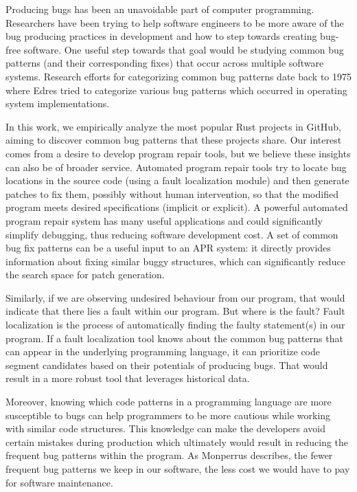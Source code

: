 Producing bugs has been an unavoidable part of computer programming. Researchers have been trying to help software engineers to be more aware of the bug producing practices in development and how to step towards creating bug-free software. One useful step towards that goal would be studying common bug patterns (and their corresponding fixes) that occur across multiple software systems. Research efforts for categorizing common bug patterns date back to 1975 where Edres tried to categorize various bug patterns which occurred in operating system implementations.  

In this work, we empirically analyze the most popular Rust projects in GitHub, aiming to discover common bug patterns that these projects share. Our interest comes from a desire to develop program repair tools, but we believe these insights can also be of broader service. Automated program repair tools try to locate bug locations in the source code (using a fault localization module) and then generate patches to fix them, possibly without human intervention, so that the modified program meets desired specifications (implicit or explicit). A powerful automated program repair system has many useful applications and could significantly simplify debugging, thus reducing software development cost. A set of common bug fix patterns can be a useful input to an APR system: it directly provides information about fixing similar buggy structures, which can significantly reduce the search space for patch generation. 

Similarly, if we are observing undesired behaviour from our program, that would indicate that there lies a fault within our program. But where is the fault? Fault localization is the process of automatically finding the faulty statement(s) in our program. If a fault localization tool knows about the common bug patterns that can appear in the underlying programming language, it can prioritize code segment candidates based on their potentials of producing bugs. That would result in a more robust tool that leverages historical data.

Moreover, knowing which code patterns in a programming language are more susceptible to bugs can help programmers to be more cautious while working with similar code structures. This knowledge can make the developers avoid certain mistakes during production which ultimately would result in reducing the frequent bug patterns within the program. As Monperrus describes, the fewer frequent bug patterns we keep in our software, the less cost we would have to pay for software maintenance.



